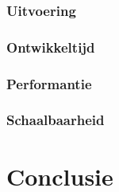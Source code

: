 \subsubsection{Uitvoering}



\subsubsection{Ontwikkeltijd}



\subsubsection{Performantie}



\subsubsection{Schaalbaarheid}




\section{Conclusie}






















